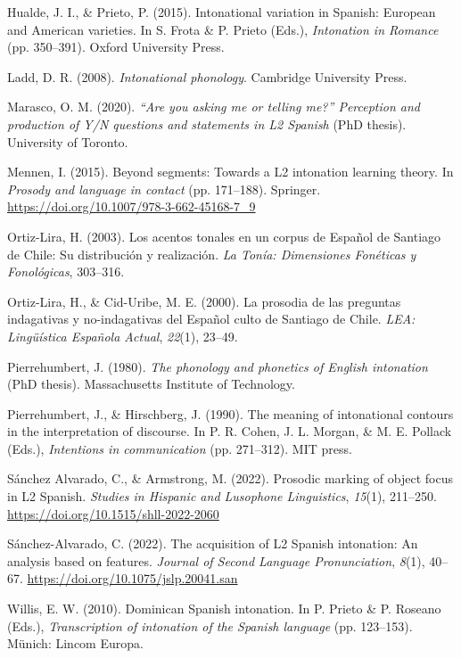 \documentclass[]{article}
\newlength{\cslhangindent}
\newenvironment{CSLReferences}[2] %
 {%
  \setlength{\parindent}{0pt}
  \ifodd #1 \everypar{\setlength{\hangindent}{\cslhangindent}}\ignorespaces\fi
  \ifnum #2 > 0
  \setlength{\parskip}{#2\baselineskip}
  \fi
 }%
 {}
\begin{document}
\begin{CSLReferences}{1}{0}
\leavevmode{}%
Hualde, J. I., \& Prieto, P. (2015). Intonational variation in {S}panish: {E}uropean and {A}merican varieties. In S. Frota \& P. Prieto (Eds.), \emph{Intonation in {R}omance} (pp. 350--391). Oxford University Press.

\leavevmode{}%
Ladd, D. R. (2008). \emph{Intonational phonology}. Cambridge University Press.

\leavevmode{}%
Marasco, O. M. (2020). \emph{{``Are you asking me or telling me?''} {P}erception and production of {Y/N} questions and statements in {L}2 {S}panish} (PhD thesis). University of Toronto.

\leavevmode{}%
Mennen, I. (2015). Beyond segments: {T}owards a {L}2 intonation learning theory. In \emph{Prosody and language in contact} (pp. 171--188). Springer. \url{https://doi.org/10.1007/978-3-662-45168-7_9}

\leavevmode{}%
Ortiz-Lira, H. (2003). Los acentos tonales en un corpus de {E}spañol de {Santiago de Chile}: Su distribución y realización. \emph{La Tonía: Dimensiones Fonéticas y Fonológicas}, 303--316.

\leavevmode{}%
Ortiz-Lira, H., \& Cid-Uribe, M. E. (2000). La prosodia de las preguntas indagativas y no-indagativas del {E}spañol culto de {S}antiago de {C}hile. \emph{LEA: Lingüística {E}spañola {A}ctual}, \emph{22}(1), 23--49.

\leavevmode{}%
Pierrehumbert, J. (1980). \emph{The phonology and phonetics of {E}nglish intonation} (PhD thesis). Massachusetts Institute of Technology.

\leavevmode{}%
Pierrehumbert, J., \& Hirschberg, J. (1990). The meaning of intonational contours in the interpretation of discourse. In P. R. Cohen, J. L. Morgan, \& M. E. Pollack (Eds.), \emph{Intentions in communication} (pp. 271--312). {MIT} press.

\leavevmode{}%
Sánchez Alvarado, C., \& Armstrong, M. (2022). Prosodic marking of object focus in {L}2 {S}panish. \emph{Studies in Hispanic and Lusophone Linguistics}, \emph{15}(1), 211--250. \url{https://doi.org/10.1515/shll-2022-2060}

\leavevmode{}%
Sánchez-Alvarado, C. (2022). The acquisition of {L}2 {S}panish intonation: {A}n analysis based on features. \emph{Journal of Second Language Pronunciation}, \emph{8}(1), 40--67. \url{https://doi.org/10.1075/jslp.20041.san}

\leavevmode{}%
Willis, E. W. (2010). {D}ominican {S}panish intonation. In P. Prieto \& P. Roseano (Eds.), \emph{Transcription of intonation of the {S}panish language} (pp. 123--153). Münich: Lincom Europa.

\end{CSLReferences}
\end{document}
